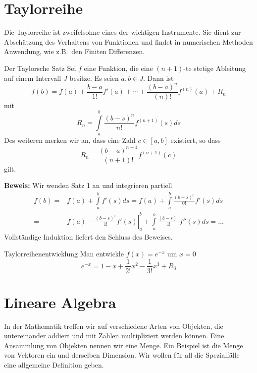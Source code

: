 \section{Taylorreihe}
Die Taylorreihe ist zweifelsohne eines der wichtigen Instrumente. Sie dient zur
Abschätzung des Verhaltens von Funktionen und findet in numerischen
Methoden Anwendung, wie z.B.\ den Finiten Differenzen.
\begin{satz}{Der Taylorsche Satz\label{theo:Taylor}} Sei $f$ eine Funktion, die
  eine $(n+1)$-te stetige Ableitung auf einem Intervall $J$ besitze. Es seien
  $a,b\in J$. Dann ist 
\[
    f(b)=f(a)+\frac{b-a}{1!}f'(a)+\cdots +\frac{(b-a)^{n}}{(n)!}f^{(n)}(a)+R_n
\]
  mit
\[
    R_n=\int\limits_a^b\frac{(b-s)^{n}}{n!}f^{(n+1)}(s)ds
\]
Des weiteren merken wir an, dass eine Zahl $c\in[a,b]$ existiert, so dass
\[
  R_n=\frac{(b-a)^{n+1}}{(n+1)!}f^{(n+1)}(c)
\]
gilt.
\end{satz}
{\bf Beweis:} Wir wenden Satz 1 an und integrieren partiell
\begin{align}
  f(b)=&f(a)+\int\limits_a^bf'(s)ds=f(a)+\int\limits_a^b\frac{(b-s)^0}{0!}f'(s)ds\nonumber\\
  =&f(a)-\left.\frac{(b-s)^1}{1!}f'(s)\right|_a^b+\int\limits_a^b\frac{(b-s)^1}{1!}f''(s)ds=\dots
  \label{eq:TaylorProof1}
\end{align}
Vollständige Induktion liefert den Schluss des Beweises.
\begin{example}{Taylorreihenentwicklung}
Man entwickle $f(x)=e^{-x}$ um $x=0$
  \[ e^{-x}=1-x+\frac{1}{2!}x^2-\frac{1}{3!}x^3+R_3 \]
\end{example}
\section{Lineare Algebra}
In der Mathematik treffen wir auf verschiedene Arten von Objekten, die
untereinander addiert und mit Zahlen multipliziert werden können. Eine
Ansammlung von Objekten nennen wir eine Menge. Ein Beispiel ist die Menge von
Vektoren ein und derselben Dimension. Wir wollen für all die
Spezialfälle eine allgemeine Definition geben. 
